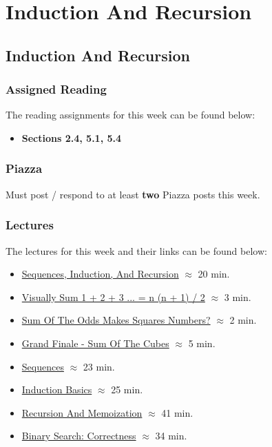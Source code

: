 \clearpage

\renewcommand{\ChapTitle}{Induction And Recursion}
\renewcommand{\SectionTitle}{Induction And Recursion}

\chapter{\ChapTitle}
\section{\SectionTitle}

\subsection{Assigned Reading}

The reading assignments for this week can be found below:

\begin{itemize}
    \item \textbf{Sections 2.4, 5.1, 5.4}
\end{itemize}

\subsection{Piazza}

Must post / respond to at least \textbf{two} Piazza posts this week.  

\subsection{Lectures}

The lectures for this week and their links can be found below:

\begin{itemize}
    \item \href{https://applied.cs.colorado.edu/mod/hvp/view.php?id=51758}{Sequences, Induction, And Recursion} $\approx$ 20 min.
    \item \href{https://www.youtube.com/watch?v=ktyTe2DGT2Y&t=97s}{Visually Sum 1 + 2 + 3 ... = n (n + 1) / 2} $\approx$ 3 min.
    \item \href{https://www.youtube.com/watch?v=3FemxVSgviw}{Sum Of The Odds Makes Squares Numbers?} $\approx$ 2 min.
    \item \href{https://www.youtube.com/watch?v=Knr5jmdb_Aw}{Grand Finale - Sum Of The Cubes} $\approx$ 5 min.
    \item \href{https://applied.cs.colorado.edu/mod/hvp/view.php?id=51762}{Sequences} $\approx$ 23 min.
    \item \href{https://applied.cs.colorado.edu/mod/hvp/view.php?id=51763}{Induction Basics} $\approx$ 25 min.
    \item \href{https://applied.cs.colorado.edu/mod/hvp/view.php?id=51765}{Recursion And Memoization} $\approx$ 41 min.
    \item \href{https://applied.cs.colorado.edu/mod/hvp/view.php?id=51769}{Binary Search: Correctness} $\approx$ 34 min.
\end{itemize}

